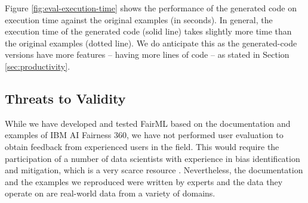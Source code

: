 \documentclass[sigconf]{acmart}
\begin{document}
{	Figure \ref{fig:eval-execution-time} shows the performance of the generated code on execution time against the original examples (in seconds). In general, the execution time of the generated code (solid line) takes slightly more time than the original examples (dotted line). 
	We do anticipate this as the generated-code versions have more features -- having more lines of code --
	as stated in Section \ref{sec:productivity}. 
	
	
	\subsection{Threats to Validity}
	\label{sec:threats_to_validity}	
	While we have developed and tested FairML based on the documentation and examples of IBM AI Fairness 360, we have not performed user evaluation to obtain feedback from experienced users in the field. This would require the participation of a number of data scientists with experience in bias identification and mitigation, which is a very scarce resource \cite{lee2021landscape}. Nevertheless, the documentation and the examples we reproduced were written by experts and the data they operate on are real-world data from a variety of domains.
	
}
\end{document}
